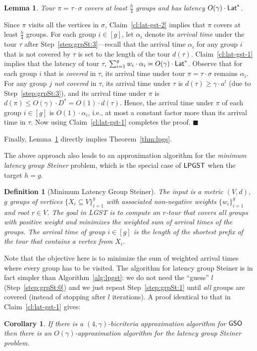 \documentclass[11pt]{article}
\newtheorem{lemma}[thm]{Lemma}
\newtheorem{corollary}[thm]{Corollary}
\newtheorem{definition}{Definition}
\def\sse{\subseteq}
\def\lat{{\sf Lat}\xspace}
\def\lpgst{\ensuremath{{\sf LPGST}}\xspace}
\def\gso{\ensuremath{{\sf GSO}}\xspace}
\def\lgs{{\sf LGST}\xspace}
\newenvironment{pf}{

\noindent{\bf Proof:}} {\hfill$\blacksquare$


}
\begin{document}
\begin{lemma}\label{th:grp-lat}
  Tour $\pi = \tau \cdot \sigma$ covers at least $\frac{h}{4}$ groups
  and has latency $O(\gamma)\cdot \lat^*$.
\end{lemma}
\begin{pf}
  Since $\pi$ visits all the vertices in $\sigma$,
  Claim~\ref{cl:lat-gst-2} implies that $\pi$ covers at least
  $\frac{h}4$ groups. For each group $i\in[g]$, let $\alpha_i$ denote
  its \emph{arrival time} under the tour $\tau$ after 
  Step~\ref{step:grpSt:3}---recall that the arrival time $\alpha_i$ for
  any group $i$ that is not covered by $\tau$ is set to the length of
  the tour $d(\tau)$. Claim~\ref{cl:lat-gst-1} implies that the latency
  of tour $\tau$, $\sum_{i=1}^g w_i\cdot \alpha_i=O(\gamma)\cdot \lat^*$.
  Observe that for each group $i$ that is {\em covered} in $\tau$, its arrival
  time under tour $\pi = \tau \cdot \sigma$ remains $\alpha_i$. For any
  group $j$ {\em not covered} in $\tau$, its arrival time under $\tau$
is $d(\tau)\ge \gamma\cdot a^l$ (due to Step~\ref{step:grpSt:3}), and its arrival time under $\pi$ is $d(\pi)\le O(\gamma) \cdot D^* = O(1)\cdot d(\tau)$. Hence, the arrival time under $\pi$ of each group $i\in
  [g]$ is $O(1)\cdot \alpha_i$, i.e., at most a constant factor more
  than its arrival time in $\tau$. Now using Claim~\ref{cl:lat-gst-1}
  completes the proof.
\end{pf}

Finally, Lemma~\ref{th:grp-lat} directly implies Theorem~\ref{thm:lpgs}.




\medskip
{}  The above approach also leads to an 
 approximation algorithm for the {\em minimum latency group Steiner}
problem, which is the special case of \lpgst when the target $h=g$. 
\smallskip

\begin{definition}[Minimum Latency Group Steiner]\label{def:lgst} The input is 
a metric $(V,d)$, $g$ groups of vertices $\{X_i\sse V\}_{i=1}^g$ with associated non-negative weights
$\{w_i\}_{i=1}^g$ and root $r\in V$. The goal in \lgs is to compute an $r$-tour 
 that covers all groups with positive weight and minimizes the weighted sum of arrival times of the groups.  
The \emph{arrival  time} of group $i\in[g]$ is the length of the shortest prefix of the tour  
that contains a vertex from $X_i$.
\end{definition}
\smallskip
Note that the objective here is to minimize the sum
of weighted arrival times where  every group has to be visited. 
 The algorithm for latency group Steiner is in fact simpler than Algorithm~\ref{alg:lpgst}: we do not need the ``guess'' $l$ (Step~\ref{step:grpSt:0}) and we just repeat Step~\ref{step:grpSt:1} until {\em all} groups are covered (instead of stopping after $l$
iterations). A proof identical to that in Claim~\ref{cl:lat-gst-1} gives:
\begin{corollary}\label{cor:lgs} 
If there is a $(4,\gamma)$-bicriteria approximation algorithm for \gso then there is an $O(\gamma)$-approximation algorithm for the latency group Steiner problem.
\end{corollary}
\end{document}
